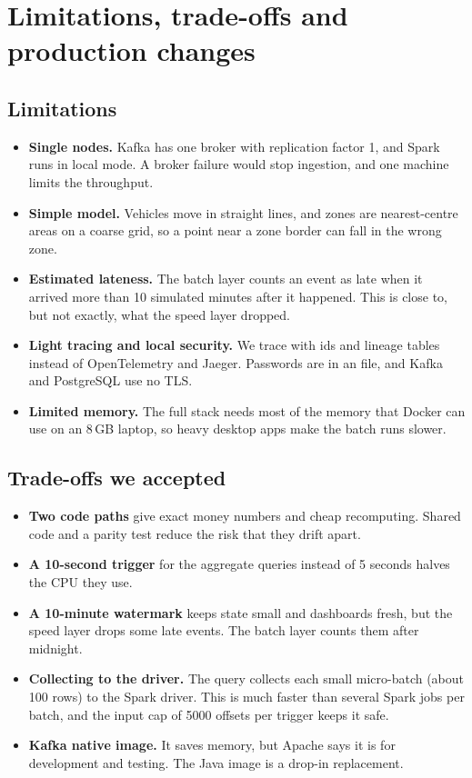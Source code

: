 \section{Limitations, trade-offs and production changes}

\subsection{Limitations}
\begin{itemize}
\item \textbf{Single nodes.} Kafka has one broker with replication factor 1, and Spark runs in local mode. A
broker failure would stop ingestion, and one machine limits the throughput.
\item \textbf{Simple model.} Vehicles move in straight lines, and zones are nearest-centre areas on a coarse
grid, so a point near a zone border can fall in the wrong zone.
\item \textbf{Estimated lateness.} The batch layer counts an event as late when it arrived more than
10 simulated minutes after it happened. This is close to, but not exactly, what the speed layer dropped.
\item \textbf{Light tracing and local security.} We trace with ids and lineage tables instead of OpenTelemetry
and Jaeger. Passwords are in an  file, and Kafka and PostgreSQL use no TLS.
\item \textbf{Limited memory.} The full stack needs most of the memory that Docker can use on an 8\,GB
laptop, so heavy desktop apps make the batch runs slower.
\end{itemize}

\subsection{Trade-offs we accepted}
\begin{itemize}
\item \textbf{Two code paths} give exact money numbers and cheap recomputing. Shared code and a parity test
reduce the risk that they drift apart.
\item \textbf{A 10-second trigger} for the aggregate queries instead of 5 seconds halves the CPU they use.
\item \textbf{A 10-minute watermark} keeps state small and dashboards fresh, but the speed layer drops some
late events. The batch layer counts them after midnight.
\item \textbf{Collecting to the driver.} The  query collects each small micro-batch
(about 100 rows) to the Spark driver. This is much faster than several Spark jobs per batch, and the input
cap of 5000 offsets per trigger keeps it safe.
\item \textbf{Kafka native image.} It saves memory, but Apache says it is for development and testing. The
Java image is a drop-in replacement.
\end{itemize}


